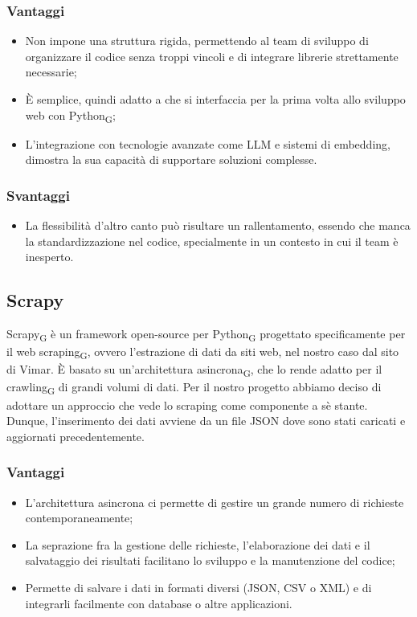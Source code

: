 \subsubsection{Vantaggi}
\begin{itemize}
    \item Non impone una struttura rigida, permettendo al team di sviluppo di organizzare il codice senza troppi vincoli e di integrare librerie strettamente necessarie;
    \item È semplice, quindi adatto a che si interfaccia per la prima volta allo sviluppo web con Python\textsubscript{G};
    \item L'integrazione con tecnologie avanzate come LLM e sistemi di embedding, dimostra la sua capacità di supportare soluzioni complesse.
\end{itemize}
\subsubsection{Svantaggi}
\begin{itemize}
    \item La flessibilità d'altro canto può risultare un rallentamento, essendo che manca la standardizzazione nel codice, specialmente in un contesto in cui il team è inesperto.
\end{itemize}

\subsection{Scrapy}
Scrapy\textsubscript{G} è un framework open-source per Python\textsubscript{G} progettato specificamente per il web scraping\textsubscript{G}, ovvero l'estrazione di dati da siti web, nel nostro caso dal sito di Vimar. È basato su un'architettura asincrona\textsubscript{G}, che lo rende adatto per il crawling\textsubscript{G} di grandi volumi di dati. Per il nostro progetto abbiamo deciso di adottare un approccio che vede lo scraping come componente a sè stante. Dunque, l'inserimento dei dati avviene da un file JSON dove sono stati caricati e aggiornati precedentemente.
\subsubsection{Vantaggi}
\begin{itemize}
    \item L'architettura asincrona ci permette di gestire un grande numero di richieste contemporaneamente;
    \item La seprazione fra la gestione delle richieste, l'elaborazione dei dati e il salvataggio dei risultati facilitano lo sviluppo e la manutenzione del codice;
    \item Permette di salvare i dati in formati diversi (JSON, CSV o XML) e di integrarli facilmente con database o altre applicazioni.
\end{itemize}
